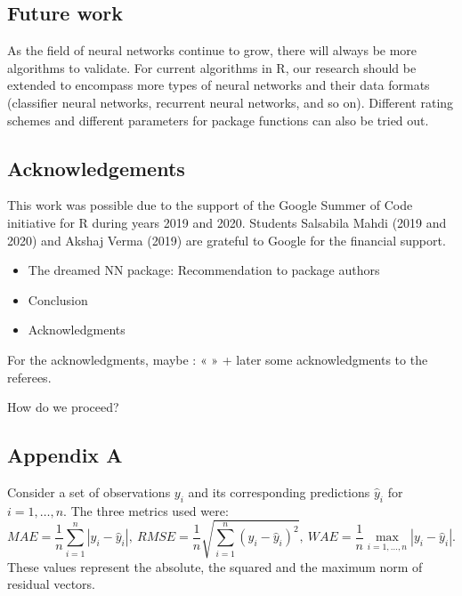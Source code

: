 \hypertarget{future-work}{%
\subsection{Future work}\label{future-work}}

As the field of neural networks continue to grow, there will always be
more algorithms to validate. For current algorithms in R, our research
should be extended to encompass more types of neural networks and their
data formats (classifier neural networks, recurrent neural networks, and
so on). Different rating schemes and different parameters for package
functions can also be tried out.

\hypertarget{acknowledgements}{%
\subsection{Acknowledgements}\label{acknowledgements}}

This work was possible due to the support of the Google Summer of Code
initiative for R during years 2019 and 2020. Students Salsabila Mahdi
(2019 and 2020) and Akshaj Verma (2019) are grateful to Google for the
financial support.



\begin{itemize}
\tightlist
\item
  The dreamed NN package: Recommendation to package authors
\item
  Conclusion
\item
  Acknowledgments
\end{itemize}

For the acknowledgments, maybe : « » + later some acknowledgments to the
referees.

How do we proceed?

\hypertarget{appendix-a}{%
\subsection{Appendix A}\label{appendix-a}}

Consider a set of observations \(y_i\) and its corresponding predictions
\(\hat y_i\) for \(i=1,\dots,n\). The three metrics used were: \[
MAE = \frac1n\sum_{i=1}^n|y_i - \hat y_i|,~
RMSE = \frac1n\sqrt{\sum_{i=1}^n(y_i - \hat y_i)^2},~
WAE = \frac1n\max_{i=1,\dots,n}|y_i - \hat y_i|.
\] These values represent the absolute, the squared and the maximum norm
of residual vectors.


